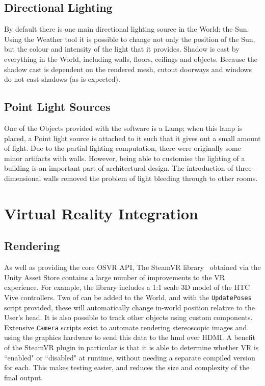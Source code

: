 \subsection{Directional Lighting}
\label{dir}

By default there is one main directional lighting source in the World: the Sun. Using the Weather tool it is possible to change not only the position of the Sun, but the colour and intensity of the light that it provides. Shadow is cast by everything in the World, including walls, floors, ceilings and objects. Because the shadow cast is dependent on the rendered mesh, cutout doorways and windows do not cast shadows (as is expected). 

\subsection{Point Light Sources}
\label{sec:points}

One of the Objects provided with the software is a Lamp; when this lamp is placed, a Point light source is attached to it such that it gives out a small amount of light. Due to the partial lighting computation, there were originally some minor artifacts with walls. However, being able to customise the lighting of a building is an important part of architectural design. The introduction of three-dimensional walls removed the problem of light bleeding through to other rooms.

\section{Virtual Reality Integration}
\label{sec:interaction}

\subsection{Rendering}
\label{sec:vr_render}
As well as providing the core OSVR API,  The SteamVR library~\cite{steamvrlib} obtained via the Unity Asset Store contains a large number of improvements to the VR experience. For example, the library includes a 1:1 scale 3D model of the HTC Vive controllers. Two of can be added to the World, and with the \verb|UpdatePoses| script provided, these will automatically change in-world position relative to the User's head. It is also possible to track other objects using custom components. Extensive \verb|Camera| scripts exist to automate rendering stereoscopic images and using the graphics hardware to send this data to the \acrshort{hmd} over HDMI. A benefit of the SteamVR plugin in particular is that it is able to determine whether VR is ``enabled" or ``disabled" at runtime, without needing a separate compiled version for each. This makes testing easier, and reduces the size and complexity of the final output.

